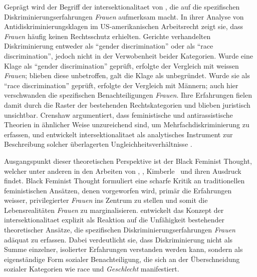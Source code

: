 Geprägt wird der Begriff der \gls{intersektionalitaet} von \textcite{crenshawMappingMarginsIntersectionality1991}, die auf die spezifischen Diskriminierungserfahrungen \emph{}\footnotemark \emph{Frauen} aufmerksam macht. In ihrer Analyse von Antidiskriminierungsklagen im US-amerikanischen Arbeitsrecht zeigt sie, dass \emph{} \emph{Frauen} häufig keinen Rechtsschutz erhielten. Gerichte verhandelten Diskriminierung entweder als \enquote{gender discrimination} oder als \enquote{race discrimination}, jedoch nicht in der Verwobenheit beider Kategorien. Wurde eine Klage als \enquote{gender discrimination} geprüft, erfolgte der Vergleich mit weissen \emph{Frauen}; blieben diese unbetroffen, galt die Klage als unbegründet. Wurde sie als \enquote{race discrimination} geprüft, erfolgte der Vergleich mit \emph{} Männern; auch hier verschwanden die spezifischen Benachteiligungen \emph{} \emph{Frauen}. Ihre Erfahrungen fielen damit durch die Raster der bestehenden Rechtskategorien und blieben juristisch unsichtbar. Crenshaw argumentiert, dass feministische und antirassistische Theorien in ähnlicher Weise unzureichend sind, um Mehrfachdiskriminierung zu erfassen, und entwickelt \gls{intersektionalitaet} als analytisches Instrument zur Beschreibung solcher überlagerten Ungleichheitsverhältnisse \parencite[\gls{vgl}][]{hancockWhenMultiplicationDoesnt2007}.


Ausgangspunkt dieser theoretischen Perspektive ist der Black Feminist Thought, welcher unter anderen in den Arbeiten von \textcite{hooksAintWomanBlack1981}, \textcite{lordeSisterOutsiderEssays1984}, Kimberle~\textcite{crenshawMappingMarginsIntersectionality1991} und \textcite{collinsBlackFeministThought2002} ihren Ausdruck findet. Black Feminist Thought formuliert eine scharfe Kritik an traditionellen feministischen Ansätzen, denen vorgeworfen wird, primär die Erfahrungen weisser, privilegierter \emph{Frauen} ins Zentrum zu stellen und somit die Lebensrealitäten \emph{} \emph{Frauen} zu marginalisieren. \textcite{crenshawMappingMarginsIntersectionality1991} entwickelt das Konzept der \gls{intersektionalitaet} explizit als Reaktion auf die Unfähigkeit bestehender theoretischer Ansätze, die spezifischen Diskriminierungserfahrungen \emph{} \emph{Frauen} adäquat zu erfassen. Dabei verdeutlicht sie, dass Diskriminierung nicht als Summe einzelner, isolierter Erfahrungen verstanden werden kann, sondern als eigenständige Form sozialer Benachteiligung, die sich an der Überschneidung sozialer Kategorien wie \gls{race} und \emph{Geschlecht} manifestiert.

